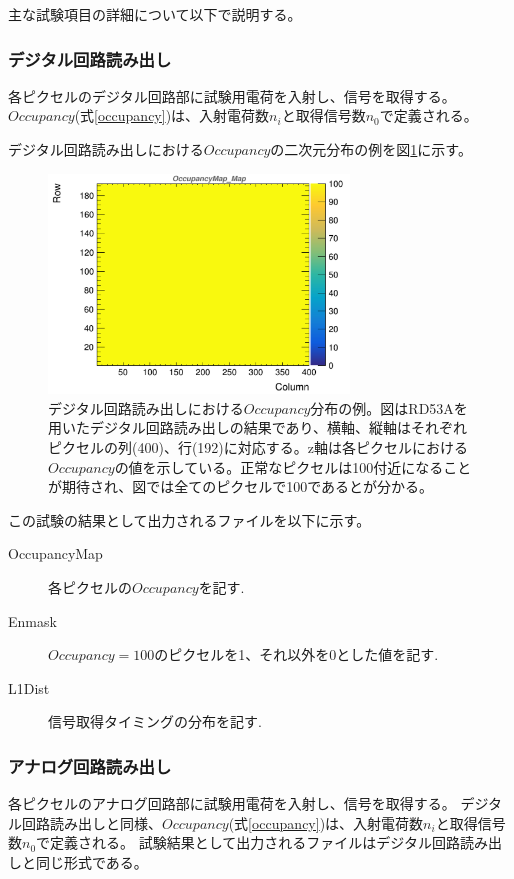 主な試験項目の詳細について以下で説明する。

\subsubsection{デジタル回路読み出し}
各ピクセルのデジタル回路部に試験用電荷を入射し、信号を取得する。
$Occupancy$(式\ref{occupancy})は、入射電荷数$n_i$と取得信号数$n_0$で定義される。

デジタル回路読み出しにおける$Occupancy$の二次元分布の例を図\ref{dig_occ}に示す。
\begin{figure}[bpt]\centering
\includegraphics[width=8cm]{dig_occ}
\caption[デジタル回路読み出しにおける$Occupancy$分布の例。]{デジタル回路読み出しにおける$Occupancy$分布の例。図はRD53Aを用いたデジタル回路読み出しの結果であり、横軸、縦軸はそれぞれピクセルの列(400)、行(192)に対応する。z軸は各ピクセルにおける$Occupancy$の値を示している。正常なピクセルは100付近になることが期待され、図では全てのピクセルで100であるとが分かる。}
\label{dig_occ}
\end{figure}

この試験の結果として出力されるファイルを以下に示す。
\begin{description}
  \item [OccupancyMap] 各ピクセルの$Occupancy$を記す.
  \item [Enmask] $Occupancy=100$のピクセルを1、それ以外を0とした値を記す.
  \item [L1Dist] 信号取得タイミングの分布を記す.
\end{description}

\subsubsection{アナログ回路読み出し}
各ピクセルのアナログ回路部に試験用電荷を入射し、信号を取得する。
デジタル回路読み出しと同様、$Occupancy$(式\ref{occupancy})は、入射電荷数$n_i$と取得信号数$n_0$で定義される。
試験結果として出力されるファイルはデジタル回路読み出しと同じ形式である。

